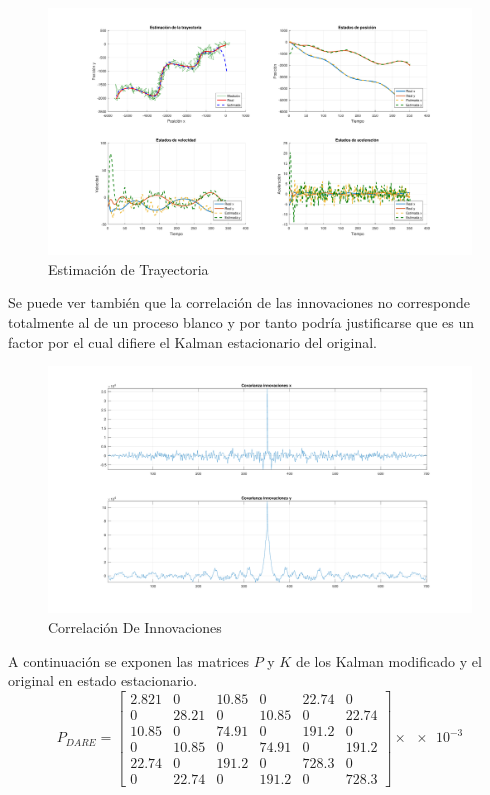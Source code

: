 	\begin{figure}[H]
		\centering
		\includegraphics[scale=0.5,trim={6,5cm 0 0 0}]{Figuras/graf_ej5.pdf}
		\caption{Estimación de Trayectoria}
		\label{fig:ej5}
	\end{figure}
	
	Se puede ver también que la correlación de las innovaciones no corresponde totalmente al de un proceso blanco y por tanto podría justificarse que es un factor por el cual difiere el Kalman estacionario del original.
	\begin{figure}[H]
		\centering
		\includegraphics[width=1.0\textwidth,keepaspectratio]{Figuras/covinn_ej5.pdf}
		\caption{Correlación De Innovaciones}
		\label{fig:ej6_cov}
	\end{figure}

	A continuación se exponen las matrices $P$ y $K$ de los Kalman modificado y el original en estado estacionario.
	\begin{equation}
	P_{\textit{DARE}} = \begin{bmatrix} \num{2.821}&0&\num{10.85}&0&22.74&0 \\[0.3em] 0&\num{28.21}&0&\num{10.85}&0&\num{22.74}\\[0.3em] \num{10.85}&0&\num{74.91}&0&\num{191.2}&0\\[0.3em] 0&\num{10.85}&0&\num{74.91}&0&\num{191.2}\\[0.3em] \num{22.74}&0&\num{191.2}&0&\num{728.3}&0\\[0.3em] 0&\num{22.74}&0&\num{191.2}&0&\num{728.3}\end{bmatrix}\times\num{e-3}
		\label{eq:pdare}
	\end{equation}

